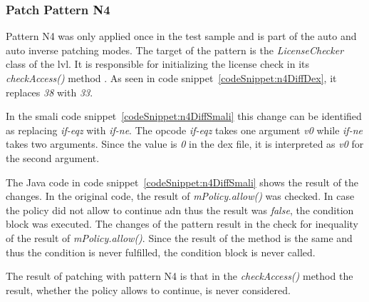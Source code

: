 \subsubsection{Patch Pattern N4}
Pattern N4 was only applied once in the test sample and is part of the auto and auto inverse patching modes.
The target of the pattern is the \textit{LicenseChecker} class of the \gls{lvl}.
It is responsible for initializing the license check in its \textit{checkAccess()} method \cite{developersLicensingReference}.
\newline
As seen in code snippet~\ref{codeSnippet:n4DiffDex}, it replaces \textit{38} with \textit{33}.
\newline

In the smali code snippet~\ref{codeSnippet:n4DiffSmali} this change can be identified as replacing \textit{if-eqz} with \textit{if-ne}.
The opcode \textit{if-eqz} takes one argument \textit{v0} while \textit{if-ne} takes two arguments.
Since the value is \textit{0} in the \gls{dex} file, it is interpreted as \textit{v0} for the second argument.
\newline

The Java code in code snippet~\ref{codeSnippet:n4DiffSmali} shows the result of the changes.
In the original code, the result of \textit{mPolicy.allow()} was checked.
In case the policy did not allow to continue adn thus the result was \textit{false}, the condition block was executed.
The changes of the pattern result in the check for inequality of the result of \textit{mPolicy.allow()}.
Since the result of the method is the same and thus the condition is never fulfilled, the condition block is never called.
\newline

The result of patching with pattern N4 is that in the \textit{checkAccess()} method the result, whether the policy allows to continue, is never considered.

